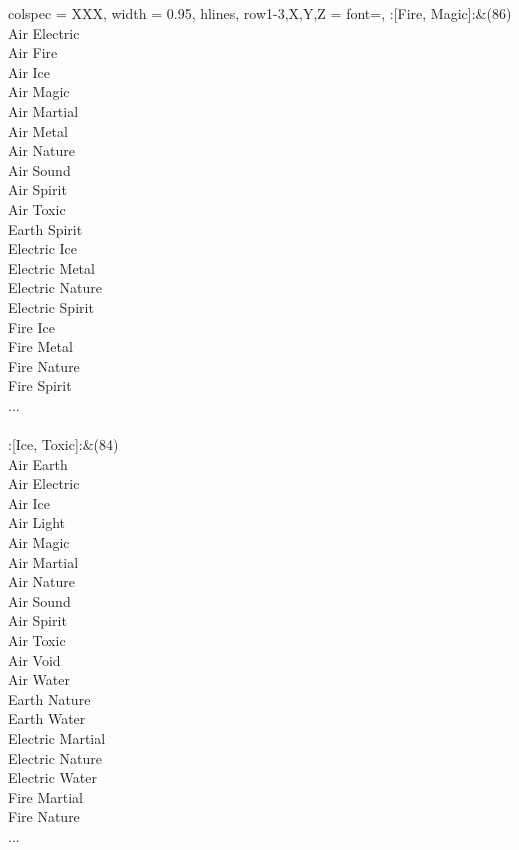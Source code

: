 \begin{longtblr}[
	caption = {2v2 Defending Weak},
	label = {2v2-Defending-Weak},
]{
	colspec = {XXX}, width = 0.95\linewidth,
	hlines,
	row{1-3,X,Y,Z} = {font=\bfseries},
}
	:[Fire, Magic]:&{(86)\\
	Air Electric \\
	Air Fire \\
	Air Ice \\
	Air Magic \\
	Air Martial \\
	Air Metal \\
	Air Nature \\
	Air Sound \\
	Air Spirit \\
	Air Toxic \\
	Earth Spirit \\
	Electric Ice \\
	Electric Metal \\
	Electric Nature \\
	Electric Spirit \\
	Fire Ice \\
	Fire Metal \\
	Fire Nature \\
	Fire Spirit \\
	...\\
	}\\

	:[Ice, Toxic]:&{(84)\\
	Air Earth \\
	Air Electric \\
	Air Ice \\
	Air Light \\
	Air Magic \\
	Air Martial \\
	Air Nature \\
	Air Sound \\
	Air Spirit \\
	Air Toxic \\
	Air Void \\
	Air Water \\
	Earth Nature \\
	Earth Water \\
	Electric Martial \\
	Electric Nature \\
	Electric Water \\
	Fire Martial \\
	Fire Nature \\
	...\\
	}\\


\end{longtblr}
